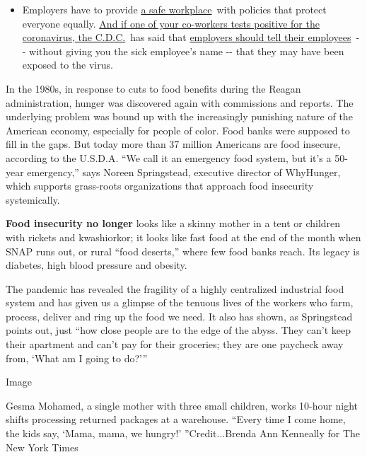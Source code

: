 \begin{itemize}
  \begin{itemize}
  \tightlist
  \item
    Employers have to provide
    \href{https://www.osha.gov/SLTC/covid-19/standards.html}{a safe
    workplace}~with policies that protect everyone equally.
    \href{https://www.nytimes3xbfgragh.onion/article/coronavirus-money-unemployment.html?action=click\&pgtype=Article\&state=default\&region=MAIN_CONTENT_3\&context=storylines_faq}{And
    if one of your co-workers tests positive for the coronavirus, the
    C.D.C.}~has said that
    \href{https://www.cdc.gov/coronavirus/2019-ncov/community/guidance-business-response.html}{employers
    should tell their employees}~-\/- without giving you the sick
    employee's name -\/- that they may have been exposed to the virus.
  \end{itemize}
\end{itemize}

In the 1980s, in response to cuts to food benefits during the Reagan
administration, hunger was discovered again with commissions and
reports. The underlying problem was bound up with the increasingly
punishing nature of the American economy, especially for people of
color. Food banks were supposed to fill in the gaps. But today more than
37 million Americans are food insecure, according to the U.S.D.A. ``We
call it an emergency food system, but it's a 50-year emergency,'' says
Noreen Springstead, executive director of WhyHunger, which supports
grass-roots organizations that approach food insecurity systemically.

\textbf{Food insecurity no longer} looks like a skinny mother in a tent
or children with rickets and kwashiorkor; it looks like fast food at the
end of the month when SNAP runs out, or rural ``food deserts,'' where
few food banks reach. Its legacy is diabetes, high blood pressure and
obesity.

The pandemic has revealed the fragility of a highly centralized
industrial food system and has given us a glimpse of the tenuous lives
of the workers who farm, process, deliver and ring up the food we need.
It also has shown, as Springstead points out, just ``how close people
are to the edge of the abyss. They can't keep their apartment and can't
pay for their groceries; they are one paycheck away from, `What am I
going to do?'''

Image

Gesma Mohamed, a single mother with three small children, works 10-hour
night shifts processing returned packages at a warehouse. ``Every time I
come home, the kids say, `Mama, mama, we hungry!' ''Credit...Brenda Ann
Kenneally for The New York Times

